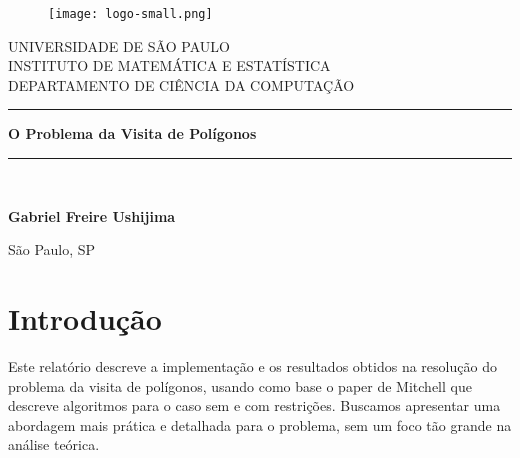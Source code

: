 \documentclass{article}
\begin{document}
\begin{titlepage}

\begin{center}
	
	\begin{figure}[H]
		\centering
		\texttt{[image: logo-small.png]} %
	\end{figure}

	\vspace{2cm}

	{\Large \sc UNIVERSIDADE DE SÃO PAULO} \\
	{\Large \sc INSTITUTO DE MATEMÁTICA E ESTATÍSTICA} \\ [0.7cm]
	{\sc DEPARTAMENTO DE CIÊNCIA DA COMPUTAÇÃO} \\

	\vspace{2cm}

	\rule{\linewidth}{2pt}
	
	\vspace{0.2em} %
	{\Large \bfseries 
		O Problema da Visita de Polígonos \\
	}
	\vspace{0.2em} %
	
	\rule{\linewidth}{2pt} \\

\end{center}

\vspace{2.8cm}

\begin{center}
	{\large \bfseries Gabriel Freire Ushijima} \\
\end{center}

\vfill

\begin{center}
	\makeatletter
	{\large São Paulo, SP \\
	\@date}
	\makeatother
\end{center}

\end{titlepage}

\newpage

\section{Introdução}

Este relatório descreve a implementação e os resultados obtidos na resolução do problema da visita de polígonos, usando como base o paper de Mitchell \cite{mitchell2003} que descreve algoritmos para o caso sem e com restrições. Buscamos apresentar uma abordagem mais prática e detalhada para o problema, sem um foco tão grande na análise teórica.




\end{document}
